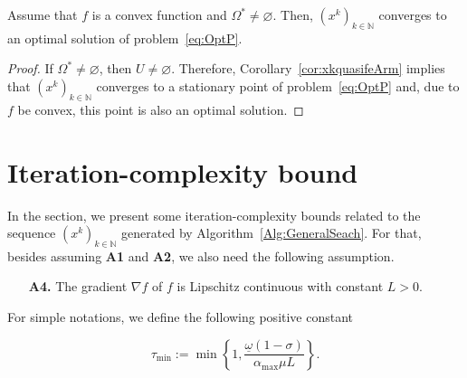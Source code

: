 \begin{theorem}
	Assume that $f$ is a convex function and  $\Omega^* \neq \varnothing$. Then,   $(x^k)_{k\in\mathbb{N}}$ converges to an optimal solution of problem~\eqref{eq:OptP}.
\end{theorem}
\begin{proof}
	If $\Omega^* \neq \varnothing$, then   $U \neq \varnothing$.   Therefore,  Corollary~\ref{cor:xkquasifeArm} implies  that $(x^k)_{k\in\mathbb{N}}$ converges to a stationary point of  problem~\eqref{eq:OptP} and,  due to  $f$ be   convex, this point  is also an optimal solution.
\end{proof}


\section{Iteration-complexity bound}\label{SubSec:IterCompArm}

In the section, we present some  iteration-complexity bounds related to  the sequence $(x^k)_{k\in\mathbb{N}}$ generated by  Algorithm~\ref{Alg:GeneralSeach}.  For that, besides  assuming  {\bf A1} and {\bf A2},  we also need the following assumption.
\begin{itemize}
	\item[{\bf A4.}] The  gradient $\nabla f$ of $f$ is  Lipschitz continuous with constant $L>0$.
\end{itemize}
For simple notations, we define the  following positive constant



\begin{equation} \label{eq;taumin}
	\tau_{\min} := \min \left\{1, \frac{\underline\omega(1-\sigma)}{{\alpha_{\max}}\mu L}\right\}.
\end{equation}


